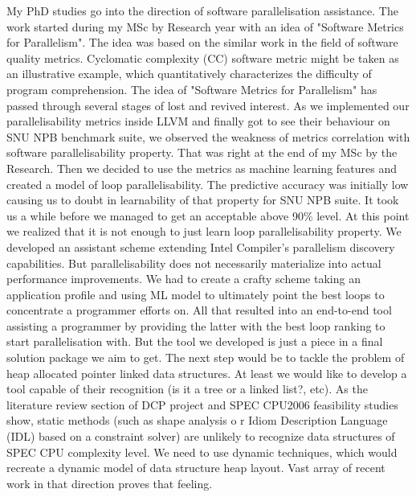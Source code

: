 \documentclass[10pt,a4paper]{report}
\begin{document}
\quad My PhD studies go into the direction of software parallelisation assistance. The work started during my MSc by Research year with an idea of "Software Metrics for Parallelism". The idea was based on the similar work in the field of software quality metrics. Cyclomatic complexity (CC) software metric might be taken as an illustrative example, which quantitatively characterizes the difficulty of program comprehension. The idea of "Software Metrics for Parallelism" has passed through several stages of lost and revived interest. As we implemented our parallelisability metrics inside LLVM and finally got to see their behaviour on SNU NPB benchmark suite, we observed the weakness of metrics correlation with software parallelisability property. That was right at the end of my MSc by the Research. Then we decided to use the metrics as machine learning features and created a model of loop parallelisability. The predictive accuracy was initially low causing us to doubt in learnability of that property for SNU NPB suite. It took us a while before we managed to get an acceptable above 90\% level. At this point we realized that it is not enough to just learn loop parallelisability property. We developed an assistant scheme extending Intel Compiler's parallelism discovery capabilities. But parallelisability does not necessarily materialize into actual performance improvements. We had to create a crafty scheme taking an application profile and using ML model to ultimately point the best loops to concentrate a programmer efforts on. All that resulted into an end-to-end tool assisting a programmer by providing the latter with the best loop ranking to start parallelisation with.\newline\null
\quad But the tool we developed is just a piece in a final solution package we aim to get. The next step would be to tackle the problem of heap allocated pointer linked data structures. At least we would like to develop a tool capable of their recognition (is it a tree or a linked list?, etc). As the literature review section of DCP project and SPEC CPU2006 feasibility studies show, static methods (such as shape analysis o
r Idiom Description Language (IDL) based on a constraint solver) are unlikely to recognize data structures of SPEC CPU complexity level. We need to use dynamic techniques, which would recreate a dynamic model of data structure heap layout. Vast array of recent work in that direction proves that feeling.    
\end{document}
